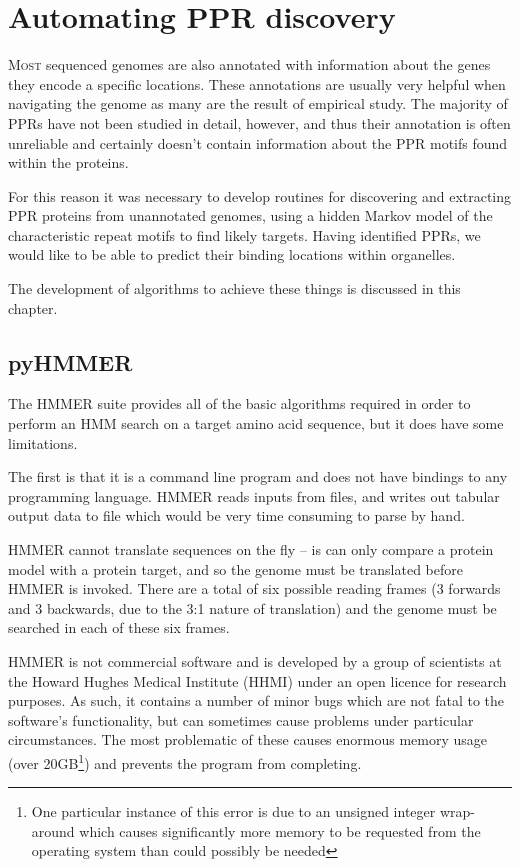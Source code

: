 
\chapter{Automating PPR discovery} 
\label{chap:methods}

\lettrine{M}{ost} 
sequenced genomes are also annotated with information about the genes they
encode a specific locations.
These annotations are usually very helpful when navigating the genome as many
are the result of empirical study.
The majority of PPRs have not been studied in detail, however, and thus their
annotation is often unreliable and certainly doesn't contain information about 
the PPR motifs found within the proteins.

For this reason it was necessary to develop routines for discovering and
extracting PPR proteins from unannotated genomes, using a hidden Markov model
of the characteristic repeat motifs to find likely targets.
Having identified PPRs, we would like to be able to predict their binding
locations within organelles.

The development of algorithms to achieve these things is discussed in this
chapter.

\section{pyHMMER}
\label{ssec:pyHMMER}

The HMMER suite provides all of the basic algorithms required in order to
perform an HMM search on a target amino acid sequence, but it does have some
limitations.

The first is that it is a command line program and does not have bindings to
any programming language.
HMMER reads inputs from files, and writes out tabular output data to file which
would be very time consuming to parse by hand.

HMMER cannot translate sequences on the fly -- is can only compare a protein 
model with a protein target, and so the genome must be translated before 
HMMER is invoked.
There are a total of six possible reading frames (3 forwards and 3 backwards, 
due to the 3:1 nature of translation) and the genome must be searched in each
of these six frames.

HMMER is not commercial software and is developed by a group of scientists at
the Howard Hughes Medical Institute (HHMI) under an open licence for research
purposes.
As such, it contains a number of minor bugs which are not fatal to the
software's functionality, but can sometimes cause problems
under particular circumstances.
The most problematic of these causes enormous
memory usage (over 20GB\footnote{One particular instance of this error is due
to an unsigned integer wrap-around which causes significantly more memory to be
requested from the operating system than could possibly be needed}) and
prevents the program from completing.

